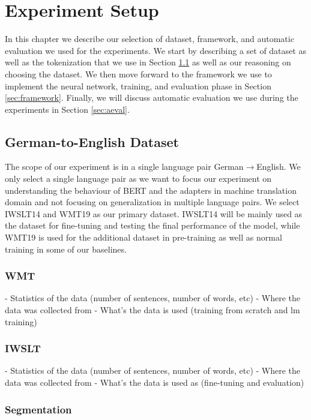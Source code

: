 
\chapter{Experiment Setup}
In this chapter we describe our selection of dataset, framework, and automatic evaluation we used for the experiments. We start by describing a set of dataset as well as the tokenization that we use in Section \ref{sec:dataset} as well as our reasoning on choosing the dataset. We then move forward to the framework we use to implement the neural network, training, and evaluation phase in Section \ref{sec:framework}. Finally, we will discuss automatic evaluation we use during the experiments in Section \ref{sec:aeval}.

\section{German-to-English Dataset}
\label{sec:dataset}
The scope of our experiment is in a single language pair German$\rightarrow$English. We only select a single language pair as we want to focus our experiment on understanding the behaviour of BERT and the adapters in machine translation domain and not focusing on generalization in multiple language pairs. We select IWSLT14 and WMT19 as our primary dataset. IWSLT14 will be mainly used as the dataset for fine-tuning and testing the final performance of the model, while WMT19 is used for the additional dataset in pre-training as well as normal training in some of our baselines.

\subsection{WMT}
- Statistics of the data (number of sentences, number of words, etc)
- Where the data was collected from
- What's the data is used (training from scratch and lm training)

\subsection{IWSLT}
- Statistics of the data (number of sentences, number of words, etc)
- Where the data was collected from
- What's the data is used as (fine-tuning and evaluation)

\subsection{Segmentation}


